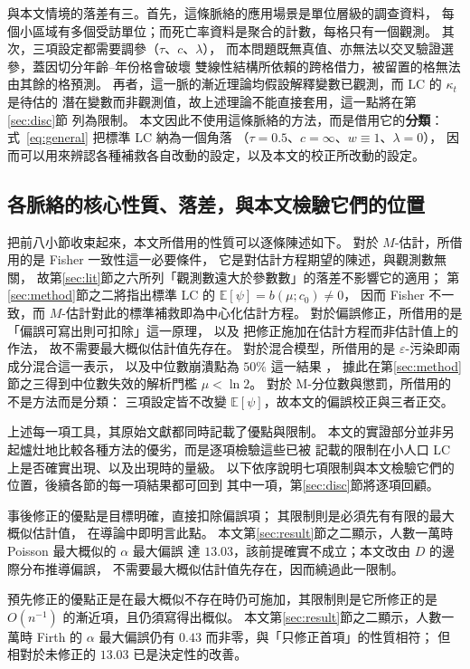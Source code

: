 \documentclass[UTF8, fontset=macnew, a4paper, 12pt]{ctexart}
\newcommand{\Ex}{\mathbb{E}}
\begin{document}
與本文情境的落差有三。首先，這條脈絡的應用場景是單位層級的調查資料，
每個小區域有多個受訪單位；而死亡率資料是聚合的計數，每格只有一個觀測。
其次，三項設定都需要調參（$\tau$、$c$、$\lambda$），
而本問題既無真值、亦無法以交叉驗證選參，蓋因切分年齡--年份格會破壞
雙線性結構所依賴的跨格借力，被留置的格無法由其餘的格預測。
再者，這一脈的漸近理論均假設解釋變數已觀測，而 LC 的 $\kappa_t$ 是待估的
潛在變數而非觀測值，故上述理論不能直接套用，這一點將在第\ref{sec:disc}節
列為限制。
本文因此不使用這條脈絡的方法，而是借用它的\textbf{分類}：
式~\eqref{eq:general} 把標準 LC 納為一個角落
（$\tau=0.5$、$c=\infty$、$w\equiv1$、$\lambda=0$），
因而可以用來辨認各種補救各自改動的設定，以及本文的校正所改動的設定。
\subsection{各脈絡的核心性質、落差，與本文檢驗它們的位置}\label{sec:limtable}

把前八小節收束起來，本文所借用的性質可以逐條陳述如下。
對於 $M$-估計，所借用的是 Fisher 一致性這一必要條件，
它是對估計方程期望的陳述，與觀測數無關，
故第\ref{sec:lit}節之六所列「觀測數遠大於參數數」的落差不影響它的適用；
第\ref{sec:method}節之二將指出標準 LC 的 $\Ex[\psi]=b(\mu;c_0)\neq0$，
因而 Fisher 不一致，而 $M$-估計對此的標準補救即為中心化估計方程。
對於偏誤修正，所借用的是「偏誤可寫出則可扣除」這一原理，
以及 \citet{kosmidis2010} 把修正施加在估計方程而非估計值上的作法，
故不需要最大概似估計值先存在。
對於混合模型，所借用的是 $\varepsilon$-污染即兩成分混合這一表示，
以及中位數崩潰點為 $50\%$ 這一結果 \citep{donoho1983}，
據此在第\ref{sec:method}節之三得到中位數失效的解析門檻 $\mu<\ln 2$。
對於 M-分位數與懲罰，所借用的不是方法而是分類：
三項設定皆不改變 $\Ex[\psi]$，故本文的偏誤校正與三者正交。

上述每一項工具，其原始文獻都同時記載了優點與限制。
本文的實證部分並非另起爐灶地比較各種方法的優劣，而是逐項檢驗這些已被
記載的限制在小人口 LC 上是否確實出現、以及出現時的量級。
以下依序說明七項限制與本文檢驗它們的位置，後續各節的每一項結果都可回到
其中一項，第\ref{sec:disc}節將逐項回顧。

事後修正的優點是目標明確，直接扣除偏誤項；
其限制則是必須先有有限的最大概似估計值，\citet{firth1993} 在導論中即明言此點。
本文第\ref{sec:result}節之二顯示，人數一萬時 Poisson 最大概似的 $\alpha$ 最大偏誤
達 $13.03$，該前提確實不成立；本文改由 $D$ 的邊際分布推導偏誤，
不需要最大概似估計值先存在，因而繞過此一限制。

預先修正的優點正是在最大概似不存在時仍可施加，其限制則是它所修正的是
$O(n^{-1})$ 的漸近項，且仍須寫得出概似。
本文第\ref{sec:result}節之二顯示，人數一萬時 Firth 的 $\alpha$ 最大偏誤仍有
$0.43$ 而非零，與「只修正首項」的性質相符；
但相對於未修正的 $13.03$ 已是決定性的改善。
\end{document}
